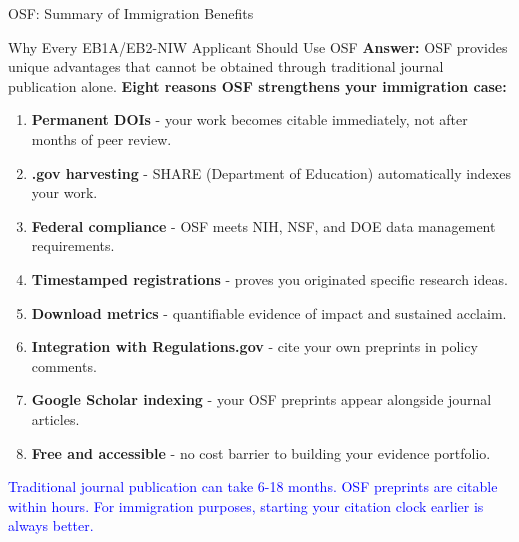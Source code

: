 \documentclass[11pt]{beamer}
\begin{document}
	\begin{frame}{OSF: Summary of Immigration Benefits}
		\scriptsize
		\begin{block}{Why Every EB1A/EB2-NIW Applicant Should Use OSF}
			\textbf{Answer:} OSF provides unique advantages that cannot be obtained through traditional journal publication alone.
			\vspace{0.1cm}
			\textbf{Eight reasons OSF strengthens your immigration case:}
			\begin{enumerate}
				\item \textbf{Permanent DOIs} - your work becomes citable immediately, not after months of peer review.
				\item \textbf{.gov harvesting} - SHARE (Department of Education) automatically indexes your work.
				\item \textbf{Federal compliance} - OSF meets NIH, NSF, and DOE data management requirements.
				\item \textbf{Timestamped registrations} - proves you originated specific research ideas.
				\item \textbf{Download metrics} - quantifiable evidence of impact and sustained acclaim.
				\item \textbf{Integration with Regulations.gov} - cite your own preprints in policy comments.
				\item \textbf{Google Scholar indexing} - your OSF preprints appear alongside journal articles.
				\item \textbf{Free and accessible} - no cost barrier to building your evidence portfolio.
			\end{enumerate}
			\textcolor{blue}{Traditional journal publication can take 6-18 months. OSF preprints are citable within hours. For immigration purposes, starting your citation clock earlier is always better.}
		\end{block}
	\end{frame}
	
	
\end{document}
